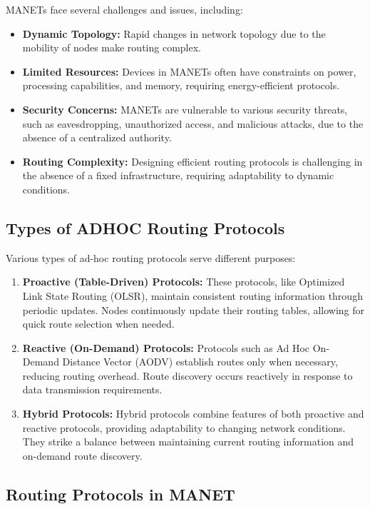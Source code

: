 \documentclass[11pt]{article}
\begin{document}
MANETs face several challenges and issues, including:

\begin{itemize}
    \item \textbf{Dynamic Topology:} Rapid changes in network topology due to the mobility of nodes make routing complex.
    \item \textbf{Limited Resources:} Devices in MANETs often have constraints on power, processing capabilities, and memory, requiring energy-efficient protocols.
    \item \textbf{Security Concerns:} MANETs are vulnerable to various security threats, such as eavesdropping, unauthorized access, and malicious attacks, due to the absence of a centralized authority.
    \item \textbf{Routing Complexity:} Designing efficient routing protocols is challenging in the absence of a fixed infrastructure, requiring adaptability to dynamic conditions.
\end{itemize}

\subsection{Types of ADHOC Routing Protocols}

Various types of ad-hoc routing protocols serve different purposes:

\begin{enumerate}
    \item \textbf{Proactive (Table-Driven) Protocols:} These protocols, like Optimized Link State Routing (OLSR), maintain consistent routing information through periodic updates. Nodes continuously update their routing tables, allowing for quick route selection when needed.
    \item \textbf{Reactive (On-Demand) Protocols:} Protocols such as Ad Hoc On-Demand Distance Vector (AODV) establish routes only when necessary, reducing routing overhead. Route discovery occurs reactively in response to data transmission requirements.
    \item \textbf{Hybrid Protocols:} Hybrid protocols combine features of both proactive and reactive protocols, providing adaptability to changing network conditions. They strike a balance between maintaining current routing information and on-demand route discovery.
\end{enumerate}

\subsection{Routing Protocols in MANET}
\end{document}
